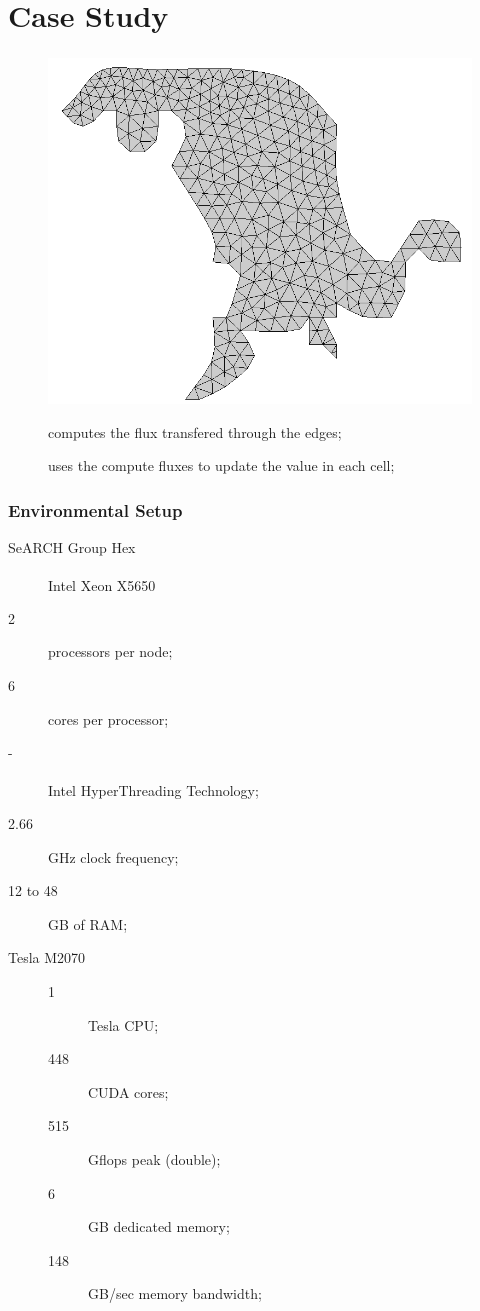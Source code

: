 \section{Case Study}

\begin{frame}[plain]
	\frametitle{\polu}
	\begin{figure}
		\centering
			\includegraphics[width=.6\textwidth]{images/foz_msh.png}
	\end{figure}
	\pause
	\begin{description}
		\item [\computeflux] computes the flux transfered through the edges;
		\item [\update] uses the compute fluxes to update the value in each cell;
	\end{description}
\end{frame}

\begin{frame}
	\frametitle{Environmental Setup}

	\begin{block}{SeARCH Group Hex}
		\begin{description}
			\item [] Intel\textsuperscript{\textregistered} Xeon\textsuperscript{\textregistered} X5650
			\item [2] processors per node;
			\item [6] cores per processor;
			\item [-] Intel\textsuperscript{\textregistered} HyperThreading Technology;
			\item [2.66] GHz clock frequency;
			\item [12 to 48] GB of RAM;
			\item [Tesla M2070]
			\begin{description}
				\item [1] Tesla CPU;
				\item [448] CUDA cores;
				\item [515] Gflops peak (double);
				\item [6] GB dedicated memory;
				\item [148] GB/sec memory bandwidth;
			\end{description}
		\end{description}
	\end{block}
\end{frame}

